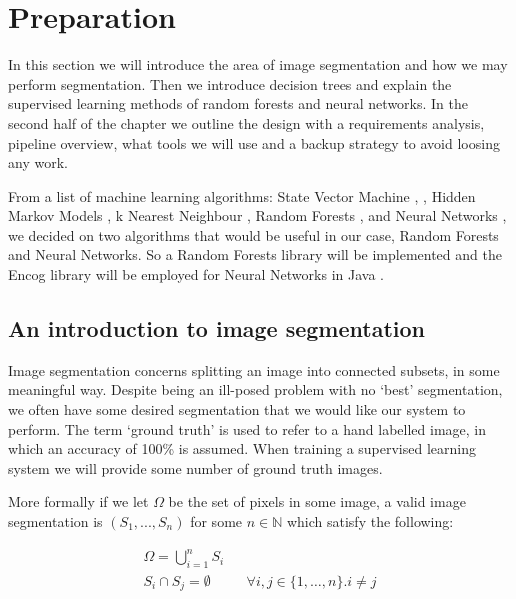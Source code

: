 \documentclass[12pt,twoside,notitlepage]{report}
\newcommand{\bb}[1]{\mathbb{#1}}
\begin{document}

\cleardoublepage
\chapter{Preparation}
    In this section we will introduce the area of image segmentation and how we may perform segmentation. Then we 
    introduce decision trees and explain the supervised learning methods of random forests and neural networks. In the 
    second half of the chapter 
    we outline the design with a requirements analysis, pipeline overview, what tools we will use and a backup strategy 
    to avoid loosing any work.

    From a list of machine learning algorithms: State Vector Machine \cite{klein2004lagrange}, \cite{law2006simple}, 
    Hidden Markov Models \cite{seymore1999learning}, k Nearest Neighbour \cite{cunningham2007k}, Random Forests 
    \cite{criminisi2013decision}, and Neural Networks \cite{heaton2008introduction}, we decided on two algorithms that 
    would be useful in our case, Random Forests and Neural Networks. So a Random Forests library will be implemented and 
    the Encog library will be employed for Neural Networks in Java \cite{JMLR:v16:heaton15a}.



    \section{An introduction to image segmentation}
        Image segmentation concerns splitting an image into connected subsets, in some meaningful way. Despite being an 
        ill-posed problem with no `best' segmentation, we often have some desired segmentation that we would 
        like our system to perform. The term `ground truth' is used to refer to a hand labelled image, in which an 
        accuracy of 100\% is assumed. When training a supervised learning system we will provide some number of ground 
        truth images. 

        More formally if we let $\Omega$ be the set of pixels in some image, a valid image segmentation is $(S_1, ..., 
        S_n)$ for some $n \in \bb{N}$ which satisfy the following:

        \begin{align}
            \Omega = \bigcup\limits_{i=1}^n S_i \\
            S_i \cap S_j = \emptyset && \forall i,j \in \{1,\ldots,n\}. i \neq j 
        \end{align}
\end{document}
